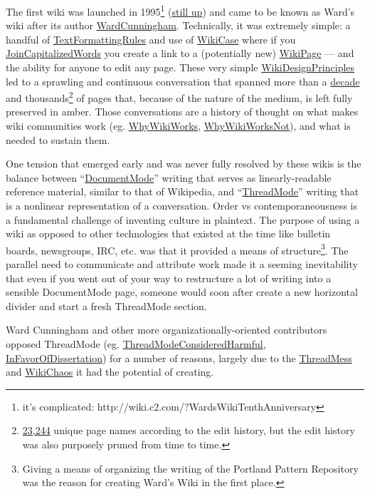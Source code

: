 \documentclass[10pt]{article}
\begin{document}
\begin{multicols}{2}
The first wiki was launched in 1995\footnote{it's complicated:
  http://wiki.c2.com/?WardsWikiTenthAnniversary}
(\href{http://wiki.c2.com/}{still up}) and came to be known as Ward's
wiki after its author
\href{http://wiki.c2.com/?WardCunningham}{WardCunningham}. Technically,
it was extremely simple: a handful of
\href{http://wiki.c2.com/?TextFormattingRules}{TextFormattingRules} and
use of \href{http://wiki.c2.com/?WikiCase}{WikiCase} where if you
\href{http://wiki.c2.com/?JoinCapitalizedWords}{JoinCapitalizedWords}
you create a link to a (potentially new)
\href{http://wiki.c2.com/?WikiPage}{WikiPage} --- and the ability for
anyone to edit any page. These very simple
\href{http://wiki.c2.com/?WikiDesignPrinciples}{WikiDesignPrinciples}
led to a sprawling and continuous conversation that spanned more than a
\href{http://wiki.c2.com/?WardsWikiTenthAnniversary}{decade} and
thousands\footnote{\href{http://c2.com/wiki/history/}{23,244} unique
  page names according to the edit history, but the edit history was
  also purposely pruned from time to time.} of pages that, because of
the nature of the medium, is left fully preserved in amber. Those
conversations are a history of thought on what makes wiki communities
work (eg. \href{http://wiki.c2.com/?WhyWikiWorks}{WhyWikiWorks},
\href{http://wiki.c2.com/?WhyWikiWorksNot}{WhyWikiWorksNot}), and what
is needed to sustain them.

One tension that emerged early and was never fully resolved by these
wikis is the balance between
``\href{http://wiki.c2.com/?DocumentMode}{DocumentMode}'' writing that
serves as linearly-readable reference material, similar to that of
Wikipedia, and ``\href{http://wiki.c2.com/?ThreadMode}{ThreadMode}''
writing that is a nonlinear representation of a conversation. Order vs
contemporaneousness is a fundamental challenge of inventing culture in
plaintext. The purpose of using a wiki as opposed to other technologies
that existed at the time like bulletin boards, newsgroups, IRC, etc. was
that it provided a means of structure\footnote{Giving a means of
  organizing the writing of the Portland Pattern Repository was the
  reason for creating Ward's Wiki in the first place.}. The parallel
need to communicate and attribute work made it a seeming inevitability
that even if you went out of your way to restructure a lot of writing
into a sensible DocumentMode page, someone would soon after create a new
horizontal divider and start a fresh ThreadMode section.

Ward Cunningham and other more organizationally-oriented contributors
opposed ThreadMode (eg.
\href{http://wiki.c2.com/?ThreadModeConsideredHarmful}{ThreadModeConsideredHarmful},
\href{http://wiki.c2.com/?InFavorOfDissertation}{InFavorOfDissertation})
for a number of reasons, largely due to the
\href{http://wiki.c2.com/?ThreadMess}{ThreadMess} and
\href{http://wiki.c2.com/?WikiChaos}{WikiChaos} it had the potential of
creating.


\end{multicols}
\end{document}

